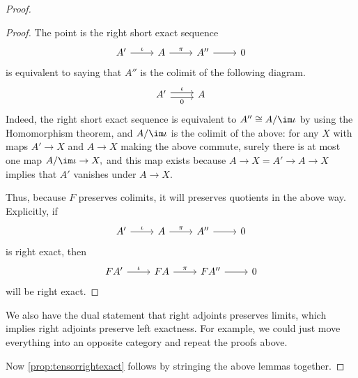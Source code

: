 \documentclass[../notes.tex]{subfiles}
\begin{document}
\begin{proof}
\begin{lemma}
	\end{lemma}
	\begin{proof}
		The point is the right short exact sequence
		\[\begin{tikzcd}
			{A'} & A & {A''} & 0
			\arrow["\iota", from=1-1, to=1-2]
			\arrow["\pi", from=1-2, to=1-3]
			\arrow[from=1-3, to=1-4]
		\end{tikzcd}\]
		is equivalent to saying that $A''$ is the colimit of the following diagram.
		\[\begin{tikzcd}
			{A'} & A
			\arrow["\iota", shift left=1, from=1-1, to=1-2]
			\arrow["0"', shift right=1, from=1-1, to=1-2]
		\end{tikzcd}\]
		Indeed, the right short exact sequence is equivalent to $A''\cong A/\im\iota$ by using the Homomorphism theorem, and $A/\im\iota$ is the colimit of the above: for any $X$ with maps $A'\to X$ and $A\to X$ making the above commute, surely there is at most one map $A/\im\iota\to X,$ and this map exists because $A\to X=A'\to A\to X$ implies that $A'$ vanishes under $A\to X.$

		Thus, because $F$ preserves colimits, it will preserves quotients in the above way. Explicitly, if
		\[\begin{tikzcd}
			{A'} & A & {A''} & 0
			\arrow["\iota", from=1-1, to=1-2]
			\arrow["\pi", from=1-2, to=1-3]
			\arrow[from=1-3, to=1-4]
		\end{tikzcd}\]
		is right exact, then
		\[\begin{tikzcd}
			{FA'} & FA & {FA''} & 0
			\arrow["\iota", from=1-1, to=1-2]
			\arrow["\pi", from=1-2, to=1-3]
			\arrow[from=1-3, to=1-4]
		\end{tikzcd}\]
		will be right exact.
	\end{proof}
	\begin{remark}
		We also have the dual statement that right adjoints preserves limits, which implies right adjoints preserve left exactness. For example, we could just move everything into an opposite category and repeat the proofs above.
	\end{remark}
	Now \autoref{prop:tensorrightexact} follows by stringing the above lemmas together.
\end{proof}
\end{document}
